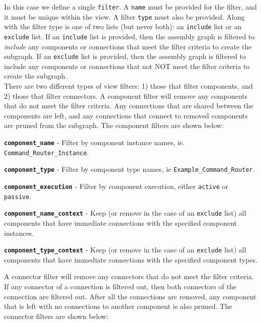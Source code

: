 In this case we define a single \texttt{filter}. A \texttt{name} must be provided for the filter, and it must be unique within the view. A filter \texttt{type} must also be provided. Along with the filter type is one of two lists (but never both): an \texttt{include} list or an \texttt{exclude} list. If an \texttt{include} list is provided, then the assembly graph is filtered to \textit{include} any components or connections that meet the filter criteria to create the subgraph. If an \texttt{exclude} list is provided, then the assembly graph is filtered to include any components or connections that not NOT meet the filter criteria to create the subgraph. \\

There are two different types of view filters: 1) those that filter components, and 2) those that filter connectors. A component filter will remove any components that do not meet the filter criteria. Any connections that are shared between the components are left, and any connections that connect to removed components are pruned from the subgraph. The component filters are shown below:

\vspace{5mm} %
\begin{spaceditemize}
  \item \textbf{\texttt{component\_name}} - Filter by component instance names, ie. \texttt{Command\_Router\_Instance}.
  \item \textbf{\texttt{component\_type}} - Filter by component type names, ie \texttt{Example\_Command\_Router}.
  \item \textbf{\texttt{component\_execution}} - Filter by component execution, either \texttt{active} or \texttt{passive}.
  \item \textbf{\texttt{component\_name\_context}} - Keep (or remove in the case of an \texttt{exclude} list) all components that have immediate connections with the specified component instances.
  \item \textbf{\texttt{component\_type\_context}} - Keep (or remove in the case of an \texttt{exclude} list) all components that have immediate connections with the specified component types.
\end{spaceditemize}
\vspace{5mm} %

A connector filter will remove any connectors that do not meet the filter criteria. If any connector of a connection is filtered out, then both connectors of the connection are filtered out. After all the connections are removed, any component that is left with no connections to another component is also pruned. The connector filters are shown below:

